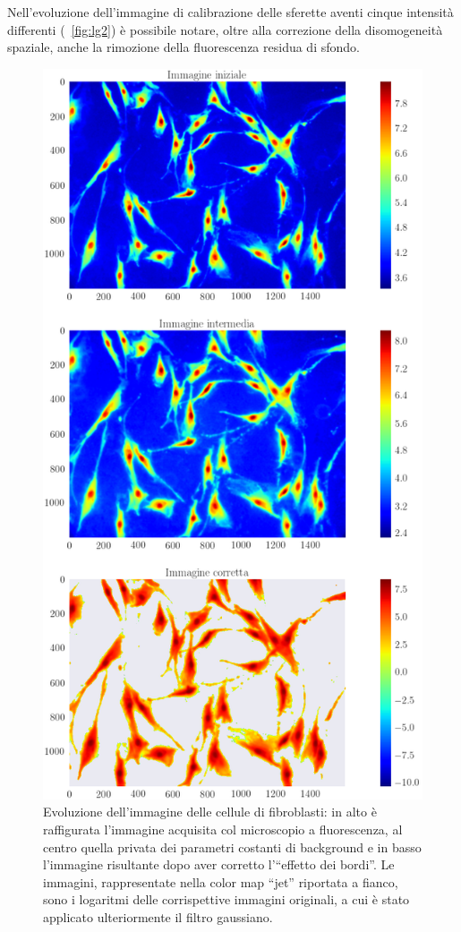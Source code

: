 Nell'evoluzione dell'immagine di calibrazione delle sferette aventi cinque intensità differenti (\figurename~\ref{fig:lg2}) è possibile notare, oltre alla correzione della disomogeneità spaziale, anche la rimozione della fluorescenza residua di sfondo.

\begin{figure}
 \centering
 \includegraphics[scale=.50]{img/CAP4lg3.png}
 \caption{\small{Evoluzione dell'immagine delle cellule di fibroblasti: in alto è raffigurata l'immagine acquisita col microscopio a fluorescenza, al centro quella privata dei parametri costanti di background e in basso l'immagine risultante dopo aver corretto l'``effetto dei bordi''. Le immagini, rappresentate nella color map ``jet'' riportata a fianco, sono i logaritmi delle corrispettive immagini originali, a cui è stato applicato ulteriormente il filtro gaussiano.}}
 \label{fig:lg3}
\end{figure}


